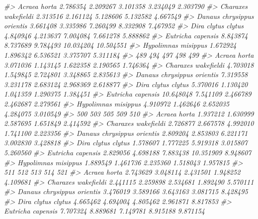 \documentclass[
]{article}
\newenvironment{Shaded}{\begin{snugshade}}{\end{snugshade}}
\newcommand{\CommentTok}[1]{\textcolor[rgb]{0.56,0.35,0.01}{\textit{#1}}}
\begin{document}
\begin{Shaded}
\begin{Highlighting}[]
\CommentTok{\#\textgreater{} Acraea horta               2.786354 2.209267 3.101358  3.234049  2.303790}
\CommentTok{\#\textgreater{} Charaxes wakefieldi        2.313516 2.161124 5.128606  5.132582  4.667549}
\CommentTok{\#\textgreater{} Danaus chrysippus orientis 3.661408 3.335986 7.260499  8.332908  7.467952}
\CommentTok{\#\textgreater{} Dira clytus clytus         4.840946 4.213637 7.004084  7.661278  5.888862}
\CommentTok{\#\textgreater{} Eutricha capensis          8.843874 8.737689 9.784493 10.034204 10.504551}
\CommentTok{\#\textgreater{} Hypolimnas misippus        1.672924 1.896342 6.536521  3.375707  5.311184}
\CommentTok{\#\textgreater{}                                  489      494      497      498      499}
\CommentTok{\#\textgreater{} Acraea horta                3.071036 1.143145 1.622358 2.190565 1.746364}
\CommentTok{\#\textgreater{} Charaxes wakefieldi         4.703018 1.549845 2.724801 3.348865 2.835613}
\CommentTok{\#\textgreater{} Danaus chrysippus orientis  7.319558 3.231178 2.683124 2.968369 2.618877}
\CommentTok{\#\textgreater{} Dira clytus clytus          5.370016 1.130420 1.041359 1.290375 1.384451}
\CommentTok{\#\textgreater{} Eutricha capensis          10.648048 7.541109 2.466789 2.462687 2.279561}
\CommentTok{\#\textgreater{} Hypolimnas misippus         4.910972 1.462646 2.652035 4.284075 3.010549}
\CommentTok{\#\textgreater{}                                 500      503      505       509      510}
\CommentTok{\#\textgreater{} Acraea horta               1.937212 1.630999 2.587695  1.651849 2.414592}
\CommentTok{\#\textgreater{} Charaxes wakefieldi        2.726877 2.667578 4.992010  1.741100 2.223356}
\CommentTok{\#\textgreater{} Danaus chrysippus orientis 2.809204 2.853803 6.221171  3.002830 3.428818}
\CommentTok{\#\textgreater{} Dira clytus clytus         1.578607 1.777225 5.919318  3.015807 5.260560}
\CommentTok{\#\textgreater{} Eutricha capensis          2.829056 4.698188 7.883438 10.351909 8.948607}
\CommentTok{\#\textgreater{} Hypolimnas misippus        1.889549 1.461736 2.235360  1.518043 1.957815}
\CommentTok{\#\textgreater{}                                 511      512      513      514      521}
\CommentTok{\#\textgreater{} Acraea horta               2.743629 3.048114 2.431501 1.948252 4.109681}
\CommentTok{\#\textgreater{} Charaxes wakefieldi        2.441115 2.259898 2.534681 1.892490 5.570111}
\CommentTok{\#\textgreater{} Danaus chrysippus orientis 3.476019 3.589166 3.643163 3.081715 8.428495}
\CommentTok{\#\textgreater{} Dira clytus clytus         4.665462 4.694004 4.805462 2.961871 8.817853}
\CommentTok{\#\textgreater{} Eutricha capensis          7.707324 8.889681 7.149781 8.915188 9.871154}

\end{Highlighting}
\end{Shaded}
\end{document}
